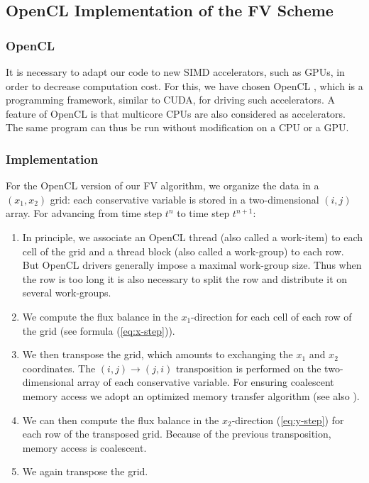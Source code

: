 \documentclass{svmult}
\begin{document}
\subsection{OpenCL Implementation of the FV Scheme}
\subsubsection{OpenCL}
It is necessary to adapt our code to new SIMD accelerators, such as
GPUs, in order to decrease computation cost. For this, we have chosen
OpenCL \cite{openclweb}, which is a programming framework, similar to
CUDA, for driving such accelerators. A feature of OpenCL is that
multicore CPUs are also considered as accelerators. The same program
can thus be run without modification on a CPU or a GPU.


\subsubsection{Implementation}
For the OpenCL version of our FV algorithm, we organize the data in a
$(x_{1},x_{2})$ grid: each conservative variable is stored in a
two-dimensional $(i,j)$ array. For advancing from time step $t^n$ to
time step $t^{n+1}$:
\begin{enumerate}
\item In principle, we associate an OpenCL thread (also called a
  work-item) to each cell of the grid and a thread block (also called
  a work-group) to each row. But OpenCL drivers generally impose a
  maximal work-group size. Thus when the row is too long it is also
  necessary to split the row and distribute it on several work-groups.
\item We compute the flux balance in the $x_{1}$-direction for each
  cell of each row of the grid (see formula (\ref{eq:x-step})).
\item We then transpose the grid, which amounts to exchanging the
  $x_{1}$ and $x_{2}$ coordinates. The $(i,j)\to (j,i)$ transposition
  is performed on the two-dimensional array of each conservative
  variable. For ensuring coalescent memory access we adopt an
  optimized memory transfer algorithm \cite{ruetsch2009optimizing}
  (see also \cite{michea2010accelerating}).
\item We can then compute the flux balance in the $x_{2}$-direction
  (\ref{eq:y-step}) for each row of the transposed grid. Because of
  the previous transposition, memory access is coalescent.
\item We again transpose the grid.
\end{enumerate}
\end{document}
